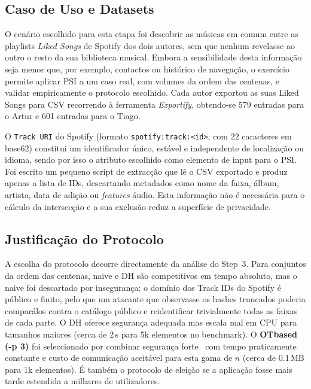\subsection{Caso de Uso e Datasets}
\label{sec:step4_caso}

O cenário escolhido para esta etapa foi descobrir as músicas em comum entre as playlists \emph{Liked Songs} de Spotify dos dois autores, sem que nenhum revelasse ao outro o resto da sua biblioteca musical. Embora a sensibilidade desta informação seja menor que, por exemplo, contactos ou histórico de navegação, o exercício permite aplicar PSI a um caso real, com volumes da ordem das centenas, e validar empiricamente o protocolo escolhido. Cada autor exportou as suas Liked Songs para CSV recorrendo à ferramenta \emph{Exportify}, obtendo-se 579 entradas para o Artur e 601 entradas para o Tiago.

O \texttt{Track URI} do Spotify (formato \texttt{spotify:track:<id>}, com 22 caracteres em base62) constitui um identificador único, estável e independente de localização ou idioma, sendo por isso o atributo escolhido como elemento de input para o PSI. Foi escrito um pequeno script de extracção que lê o CSV exportado e produz apenas a lista de IDs, descartando metadados como nome da faixa, álbum, artista, data de adição ou \emph{features} áudio. Esta informação não é necessária para o cálculo da intersecção e a sua exclusão reduz a superfície de privacidade.

\subsection{Justificação do Protocolo}
\label{sec:step4_proto}

A escolha do protocolo decorre directamente da análise do Step~3. Para conjuntos da ordem das centenas, naive e DH são competitivos em tempo absoluto, mas o naive foi descartado por insegurança: o domínio dos Track IDs do Spotify é público e finito, pelo que um atacante que observasse os hashes truncados poderia compará\-los contra o catálogo público e re\-identificar trivialmente todas as faixas de cada parte. O DH oferece segurança adequada mas escala mal em CPU para tamanhos maiores (cerca de 2\,s para 5k elementos no benchmark). O \textbf{OT\-based (-p 3)} foi seleccionado por combinar segurança forte~\cite{pinkas2016scalable} com tempo praticamente constante e custo de comunicação aceitável para esta gama de $n$ (cerca de 0.1\,MB para 1k elementos). É também o protocolo de eleição se a aplicação fosse mais tarde estendida a milhares de utilizadores.


